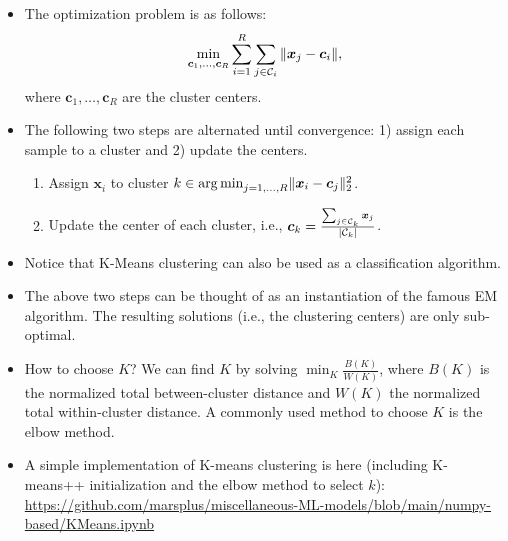 {\begin{itemize}
            \item The optimization problem is as follows:
            \begin{equation}
                \min_{\bm{c}_1, \ldots, \bm{c}_R} \sum_{i=1}^{R}{
                    \sum_{j \in \mathcal{C}_i}^{}{\lVert\bm{x}_j - \bm{c}_i\rVert}
                },
            \end{equation}
            where $\bm{c}_1, \ldots, \bm{c}_R$ are the cluster centers. 
            
            \item The following two steps are alternated until convergence: 1) assign each sample to a cluster and 2) update the centers.
            \begin{enumerate}
                \item Assign $\bm{x}_i$ to cluster $k \in \operatorname{arg\,min}_{j=1,\ldots, R}\lVert\bm{x}_i - \bm{c}_j\rVert_2^2$.
                \item Update the center of each cluster, i.e., $\bm{c}_k = \frac{\sum_{j \in \mathcal{C}_k}^{}{\bm{x}_j}}{| \mathcal{C}_k |}$.
            \end{enumerate}
            \item Notice that K-Means clustering can also be used as a classification algorithm. 
            \item The above two steps can be thought of as an instantiation of the famous EM algorithm.
            The resulting solutions (i.e., the clustering centers) are only sub-optimal.
            \item How to choose $K$? We can find $K$ by solving $\min_{K} \frac{B(K)}{W(K)}$, where $B(K)$ is the normalized total between-cluster distance and $W(K)$ the normalized total within-cluster distance. 
            A commonly used method to choose $K$ is the elbow method.
            \item A simple implementation of K-means clustering is here (including K-means++ initialization and the elbow method to select $k$): \url{https://github.com/marsplus/miscellaneous-ML-models/blob/main/numpy-based/KMeans.ipynb}
        \end{itemize}
    
}
